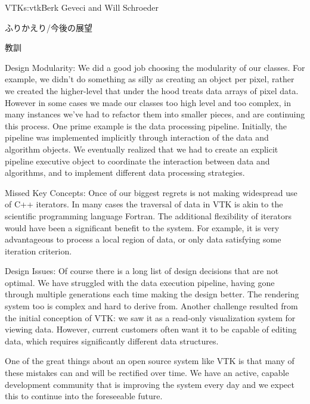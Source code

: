 \begin{aosachapter}{VTK}{s:vtk}{Berk Geveci and Will Schroeder}
\begin{aosasect1}{ふりかえり/今後の展望}
\begin{aosasect2}{教訓}
\begin{aosadescription}
  \item{Design Modularity}: We did a good job choosing the
  modularity of our classes. For example, we didn't do something as
  silly as creating an object per pixel, rather we created the
  higher-level  that under the hood treats data arrays of
  pixel data. However in some cases we made our classes too high level
  and too complex, in many instances we've had to refactor them into
  smaller pieces, and are continuing this process. One prime example
  is the data processing pipeline.  Initially, the pipeline was
  implemented implicitly through interaction of the data and algorithm
  objects. We eventually realized that we had to create an explicit
  pipeline executive object to coordinate the interaction between data
  and algorithms, and to implement different data processing
  strategies.

  \item{Missed Key Concepts}: Once of our biggest regrets is not
  making widespread use of C++ iterators. In many cases the traversal
  of data in VTK is akin to the scientific programming language
  Fortran\@. The additional flexibility of iterators would have been a
  significant benefit to the system. For example, it is very
  advantageous to process a local region of data, or only data
  satisfying some iteration criterion.

  \item{Design Issues}: Of course there is a long list of design
  decisions that are not optimal. We have struggled with the data
  execution pipeline, having gone through multiple generations each
  time making the design better. The rendering system too is complex
  and hard to derive from. Another challenge resulted from the initial
  conception of VTK: we saw it as a read-only visualization system for
  viewing data. However, current customers often want it to be capable
  of editing data, which requires significantly different data
  structures.

\end{aosadescription}

One of the great things about an open source system like VTK is that
many of these mistakes can and will be rectified over time. We have an
active, capable development community that is improving the system
every day and we expect this to continue into the foreseeable future.

\end{aosasect2}

\end{aosasect1}

\end{aosachapter}

